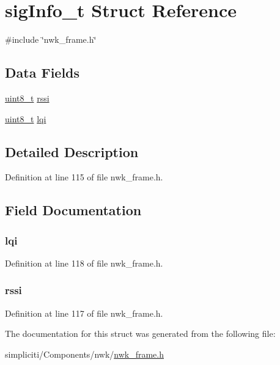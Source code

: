 \hypertarget{structsigInfo__t}{\section{sig\-Info\-\_\-t \-Struct \-Reference}
\label{structsigInfo__t}
}


{\ttfamily \#include \char`\"{}nwk\-\_\-frame.\-h\char`\"{}}

\subsection*{\-Data \-Fields}
\begin{DoxyCompactItemize}
\item 
\hyperlink{bsp__msp430__defs_8h_aba7bc1797add20fe3efdf37ced1182c5}{uint8\-\_\-t} \hyperlink{structsigInfo__t_afb67d818cd76cce8057affabcb1979a6}{rssi}
\item 
\hyperlink{bsp__msp430__defs_8h_aba7bc1797add20fe3efdf37ced1182c5}{uint8\-\_\-t} \hyperlink{structsigInfo__t_a0dd69605aea6dba42ffd851067dbfe77}{lqi}
\end{DoxyCompactItemize}


\subsection{\-Detailed \-Description}


\-Definition at line 115 of file nwk\-\_\-frame.\-h.



\subsection{\-Field \-Documentation}
\hypertarget{structsigInfo__t_a0dd69605aea6dba42ffd851067dbfe77}{
\subsubsection[{lqi}]{ {\bf lqi}}}\label{structsigInfo__t_a0dd69605aea6dba42ffd851067dbfe77}


\-Definition at line 118 of file nwk\-\_\-frame.\-h.

\hypertarget{structsigInfo__t_afb67d818cd76cce8057affabcb1979a6}{
\subsubsection[{rssi}]{ {\bf rssi}}}\label{structsigInfo__t_afb67d818cd76cce8057affabcb1979a6}


\-Definition at line 117 of file nwk\-\_\-frame.\-h.



\-The documentation for this struct was generated from the following file\-:\begin{DoxyCompactItemize}
\item 
simpliciti/\-Components/nwk/\hyperlink{nwk__frame_8h}{nwk\-\_\-frame.\-h}\end{DoxyCompactItemize}

